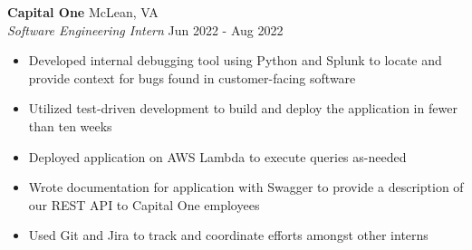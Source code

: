 \documentclass[a4paper]{article}
\begin{document}
\textbf{Capital One} \hfill McLean, VA \\
\textit{Software Engineering Intern} \hfill Jun 2022 - Aug 2022 \\
\vspace{0mm}
\begin{itemize}
	\item Developed internal debugging tool using Python and Splunk to locate and provide context for bugs found in customer-facing software
	\item Utilized test-driven development to build and deploy the application in fewer than ten weeks
	\item Deployed application on AWS Lambda to execute queries as-needed
	\item Wrote documentation for application with Swagger to provide a description of our REST API to Capital One employees
	\item Used Git and Jira to track and coordinate efforts amongst other interns
\end{itemize}
\end{document}
